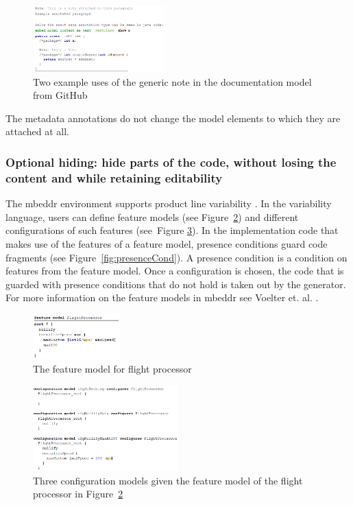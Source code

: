 \documentclass[preprint,numbers,10pt]{sigplanconf}
\begin{document}
\begin{figure}[H]
	\centering
	\includegraphics[width=0.45\textwidth]{screens/ExampleGenericNote.png}
	\caption{Two example uses of the generic note in the documentation model from GitHub}
	\label{fig:exampleGenericNote}
\end{figure}

The metadata annotations do not change the model elements to which they are attached at all.

\subsubsection{Optional hiding: hide parts of the code, without losing the content and while retaining editability}
\label{sec:OptHiding}
The mbeddr environment supports product line variability \cite{voelter2015using}. In the variability language, users can define
feature models (see Figure~\ref{fig:featureModel}) and
different configurations of such features (see~Figure \ref{fig:configs}).
In the implementation code that makes use of the features of a feature model, presence conditions guard
code fragments (see Figure~\ref{fig:presenceCond}). A presence condition is a condition on features from the feature model.
Once a configuration is chosen, the code that is guarded with presence conditions that do not hold is taken out by the generator.
For more information on the feature models in mbeddr see Voelter et. al. \cite{voelter2013mbeddr}.

\begin{figure}[H]
	\centering
	\includegraphics[width=0.30\textwidth]{screens/FeatureModelFlightProcessor.png}
	\caption{The feature model for flight processor}
	\label{fig:featureModel}
\end{figure}

\begin{figure}[H]
	\centering
	\includegraphics[width=0.50\textwidth]{screens/ConfigurationModels}
	\caption{Three configuration models given the feature model of the flight processor in Figure~\ref{fig:featureModel}}
	\label{fig:configs}
\end{figure}
\end{document}
